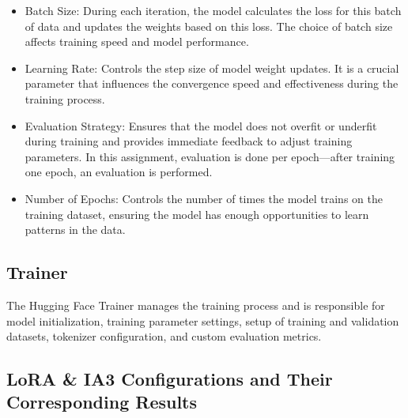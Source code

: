 \documentclass{article}
\begin{document}
\begin{itemize}
    \item Batch Size: During each iteration, the model calculates the loss for this batch of data and updates the weights based on this loss. The choice of batch size affects training speed and model performance.
    \item Learning Rate: Controls the step size of model weight updates. It is a crucial parameter that influences the convergence speed and effectiveness during the training process.
    \item Evaluation Strategy: Ensures that the model does not overfit or underfit during training and provides immediate feedback to adjust training parameters. In this assignment, evaluation is done per epoch—after training one epoch, an evaluation is performed.
    \item Number of Epochs: Controls the number of times the model trains on the training dataset, ensuring the model has enough opportunities to learn patterns in the data.
\end{itemize}

\subsection{Trainer}

\qquad The Hugging Face Trainer manages the training process and is responsible for model initialization, training parameter settings, setup of training and validation datasets, tokenizer configuration, and custom evaluation metrics.

\subsection{LoRA \& IA3 Configurations and Their Corresponding Results}
\end{document}

